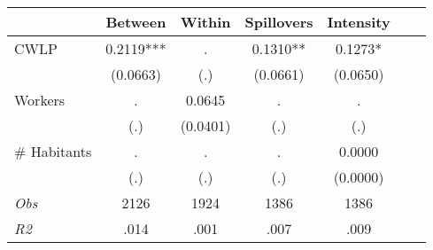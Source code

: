 \begin{tabular}{l*{6}{c}}\hline&\multicolumn{1}{c}{Between}&\multicolumn{1}{c}{Within}&\multicolumn{1}{c}{Spillovers}&\multicolumn{1}{c}{Intensity}\\ \hline 
CWLP & 0.2119*** & . & 0.1310** & 0.1273* \\
 & (0.0663) & (.) & (0.0661) & (0.0650) \\
Workers & . & 0.0645 & . & . \\
 & (.) & (0.0401) & (.) & (.) \\
\# Habitants & . & . & . & 0.0000 \\
  & (.) & (.) & (.) & (0.0000) \\
\hline \textit{Obs} & 2126 & 1924 & 1386 & 1386  \\ \textit{R2} & .014 & .001 & .007 & .009 \\ \hline \end{tabular}

